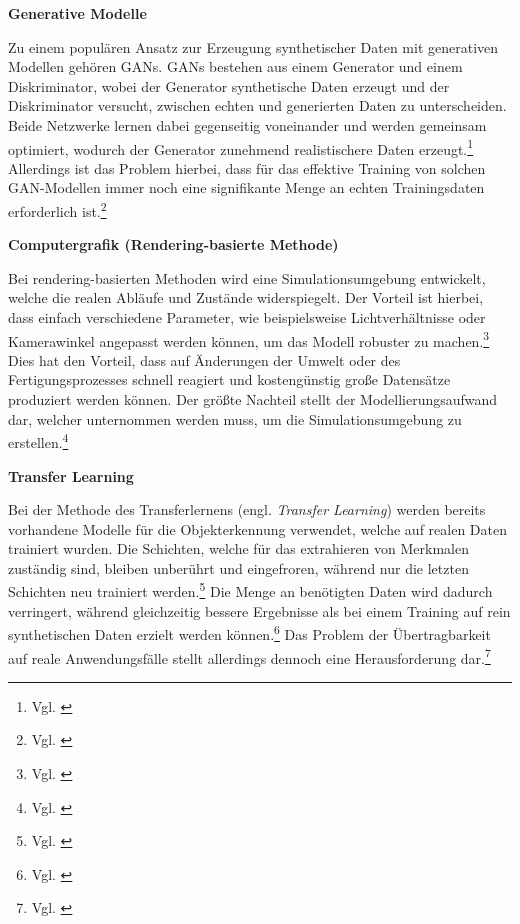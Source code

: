 \textbf{Generative Modelle}

Zu einem populären Ansatz zur Erzeugung synthetischer Daten mit generativen Modellen gehören \acp{GAN}. \acp{GAN} bestehen aus einem Generator und einem Diskriminator, wobei der Generator synthetische Daten erzeugt und der Diskriminator versucht, zwischen echten und generierten Daten zu unterscheiden. Beide Netzwerke lernen dabei gegenseitig voneinander und werden gemeinsam optimiert, wodurch der Generator zunehmend realistischere Daten erzeugt.\footnote{Vgl. \cite[S. 1010]{jain_synthetic_2022}}
Allerdings ist das Problem hierbei, dass für das effektive Training von solchen \ac{GAN}-Modellen immer noch eine signifikante Menge an echten Trainingsdaten erforderlich ist.\footnote{Vgl. \cite[S. 768]{monnet_investigating_2024}} 

\textbf{Computergrafik (Rendering-basierte Methode)}

Bei rendering-basierten Methoden wird eine Simulationsumgebung entwickelt, welche die realen Abläufe und Zustände widerspiegelt. 
Der Vorteil ist hierbei, dass einfach verschiedene Parameter, wie beispielsweise Lichtverhältnisse oder Kamerawinkel angepasst werden können, um das Modell robuster zu machen.\footnote{Vgl. \cite[S. 239]{manettas_synthetic_2021}} Dies hat den Vorteil, dass auf Änderungen der Umwelt oder des Fertigungsprozesses schnell reagiert und kostengünstig große Datensätze produziert werden können. Der größte Nachteil stellt der Modellierungsaufwand dar, welcher unternommen werden muss, um die Simulationsumgebung zu erstellen.\footnote{Vgl. \cite[S. 769]{monnet_investigating_2024}}

\textbf{Transfer Learning}

Bei der Methode des Transferlernens (engl. \textit{Transfer Learning}) werden bereits vorhandene Modelle für die Objekterkennung verwendet, welche auf realen Daten trainiert wurden. Die Schichten, welche für das extrahieren von Merkmalen zuständig sind, bleiben unberührt und eingefroren, während nur die letzten Schichten neu trainiert werden.\footnote{Vgl. \cite[S. 250]{urgo_monitoring_2024}} Die Menge an benötigten Daten wird dadurch verringert, während gleichzeitig bessere Ergebnisse als bei einem Training auf rein synthetischen Daten erzielt werden können.\footnote{Vgl. \cite[S. 251]{urgo_monitoring_2024}} Das Problem der Übertragbarkeit auf reale Anwendungsfälle stellt allerdings dennoch eine Herausforderung dar.\footnote{Vgl. \cite[S. 251]{urgo_monitoring_2024}}


